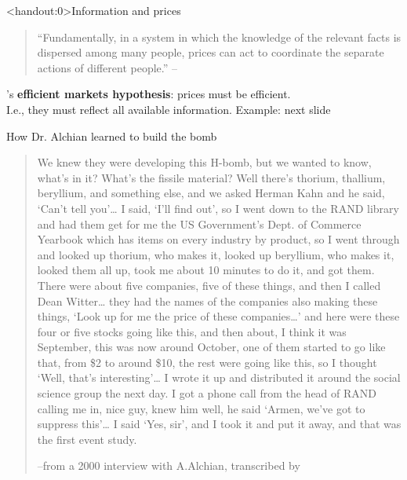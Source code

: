 \documentclass[english,10pt
,aspectratio=169
]{beamer}
\begin{document}
\begin{frame}<handout:0>{Information and prices}
	\begin{quotation}
		``Fundamentally, in a system in which the knowledge of the relevant facts is dispersed among many people, prices can act to coordinate the separate actions of different people.'' -- 
	\end{quotation}
	\pause\bigskip 
	
	's \textbf{efficient markets hypothesis}: {prices} must be {efficient}.
	\\
	I.e., they must reflect all available information. Example: next slide
\end{frame}


\begin{frame}{How Dr. Alchian learned to build the bomb}
	\small 
	\begin{quote}
		We knew they were developing this H-bomb, but we wanted to know, what's in it? What's the fissile material? Well there's thorium, thallium, beryllium, and something else, and we asked Herman Kahn and he said, ‘Can't tell you’… I said, ‘I'll find out’, so I went down to the RAND library and had them get for me the US Government's Dept. of Commerce Yearbook which has items on every industry by product, so I went through and looked up thorium, who makes it, looked up beryllium, who makes it, looked them all up, took me about 10 minutes to do it, and got them. There were about five companies, five of these things, and then I called Dean Witter… they had the names of the companies also making these things, ‘Look up for me the price of these companies…’ and here were these four or five stocks going like this, and then about, I think it was September, this was now around October, one of them started to go like that, from \$2 to around \$10, the rest were going like this, so I thought ‘Well, that's interesting’… I wrote it up and distributed it around the social science group the next day. I got a phone call from the head of RAND calling me in, nice guy, knew him well, he said ‘Armen, we've got to suppress this’… I said ‘Yes, sir’, and I took it and put it away, and that was the first event study.
		\begin{flushright}
			--from a 2000 interview with A.Alchian, transcribed by \cite{newhard_stock_2014}
		\end{flushright}
	\end{quote}
\end{frame}


%	
\end{document}
